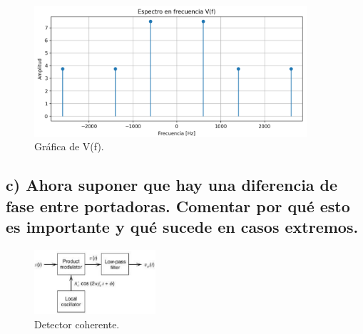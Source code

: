 \begin{figure}[H]
        \centering
        \includegraphics[width=0.9\textwidth]{imagenes/Parte_1/Actividad_4/actividad_4b.png}
        \caption{Gráfica de V(f).}
        \label{fig:2}
    \end{figure}

\bigskip
\subsection*{c) Ahora suponer que hay una diferencia de fase entre portadoras. Comentar por qué esto es importante y qué sucede en casos extremos.}
    
    \begin{figure}[H]
        \centering
        \includegraphics[width=0.4\textwidth]{imagenes/Parte_1/Actividad_2/fig2.png}
        \caption{Detector coherente.}
        \label{fig:2}
    \end{figure}
    